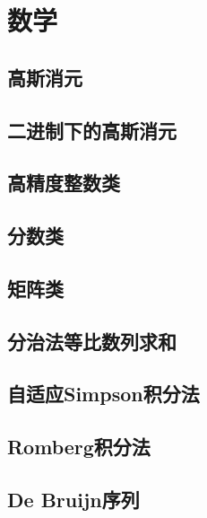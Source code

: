\section{数学}
\subsection{高斯消元}


\subsection{二进制下的高斯消元}


\subsection{高精度整数类}



\subsection{分数类}



\subsection{矩阵类}


\subsection{分治法等比数列求和}



\subsection{自适应Simpson积分法}


\subsection{Romberg积分法}


\subsection{De Bruijn序列}



